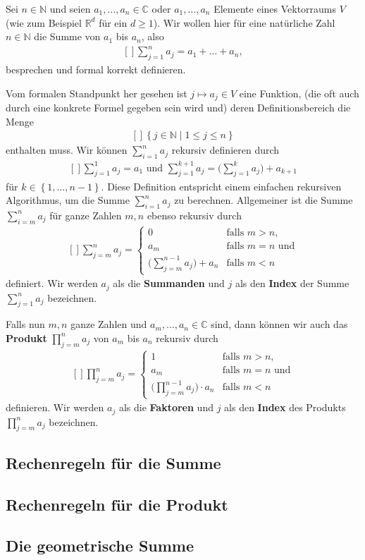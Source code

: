 \documentclass[../Analysis1_script.tex]{subfiles}
\begin{document}
Sei $n \in \mathbb {N}$ und seien $a_1,\ldots ,a_n \in \mathbb {C}$ oder $a_1,\ldots ,a_n$ Elemente eines Vektorraums $V$ (wie zum Beispiel $\mathbb {R}^d$ für ein $d \geq 1$). Wir wollen hier für eine natürliche Zahl $n\in \mathbb {N}$ die Summe von $a_1$ bis $a_n$, also
\[\begin{aligned}[]
	\sum _{j=1}^n a_j = a_1+\ldots +a_n,
\end{aligned}\]
besprechen und formal korrekt definieren.

Vom formalen Standpunkt her gesehen ist $j \mapsto a_j\in V$ eine Funktion, (die oft auch durch eine konkrete Formel gegeben sein wird und) deren Definitionsbereich die Menge
\[\begin{aligned}[]
	\left \lbrace {j \in \mathbb {N}} \mid {1 \leq j \leq n}\right \rbrace
\end{aligned}\]
enthalten muss. Wir können $\sum _{i=1}^n a_j$ rekursiv definieren durch
\[\begin{aligned}[]
	\sum _{j=1}^1 a_j = a_1\text { und } \sum _{j=1}^{k+1} a_j = \bigg (\sum _{j=1}^{k} a_j\bigg ) + a_{k+1}
\end{aligned}\]
für $k \in \left \lbrace {1,\ldots ,n-1} \right \rbrace$. Diese Definition entspricht einem einfachen rekursiven Algorithmus, um die Summe $\sum _{i=1}^n a_j$ zu berechnen. Allgemeiner ist die Summe $\sum _{i=m}^n a_j$ für ganze Zahlen $m,n$ ebenso rekursiv durch
\[\begin{aligned}[]
	\sum _{j=m}^na_j=\begin{cases}
		0 &\text {falls }m>n,\\ 
		a_m &\text {falls }m=n\text { und}\\ 
		\big (\sum _{j=m}^{n-1} a_j\big ) + a_{n}&\text {falls }m<n
	\end{cases}
\end{aligned}\]
definiert. Wir werden $a_j$ als die \textbf{Summanden} und $j$ als den \textbf{Index} der Summe $\sum _{j=1}^n a_j$ bezeichnen.  

Falls nun $m,n$ ganze Zahlen und $a_m,\ldots ,a_n \in \mathbb {C}$ sind, dann können wir auch das \textbf{Produkt} $\prod _{j=m}^n a_j$ von $a_m$ bis $a_n$ rekursiv durch
\[\begin{aligned}[]
	\prod _{j=m}^na_j=\begin{cases}
		1 &\text {falls }m>n,\\ 
		a_m &\text {falls }m=n\text { und}\\ 
		\big (\prod _{j=m}^{n-1} a_j\big ) \cdot a_{n}&\text {falls }m<n
	\end{cases}
\end{aligned}\]
definieren. Wir werden $a_j$ als die \textbf{Faktoren} und $j$ als den \textbf{Index} des Produkts $\prod _{j=m}^n a_j$ bezeichnen. 


\subsection{Rechenregeln für die Summe}

\subsection{Rechenregeln für die Produkt}

\subsection{Die geometrische Summe}
\end{document}
